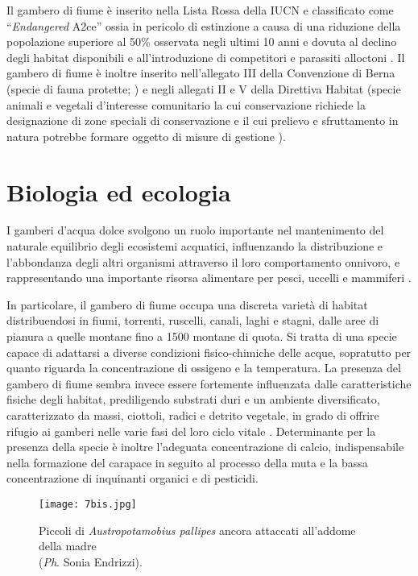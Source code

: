 \documentclass[10pt,twoside,openany,x11names,svgnames,italian,a5paper,dvipsnames,table]{memoir}
\newcommand{\ph}{\emph{Ph}. }
\begin{document}
Il gambero di fiume è inserito nella Lista Rossa della IUCN e classificato come “\emph{Endangered} A2ce” ossia in pericolo di estinzione a causa di una riduzione della popolazione superiore al 50\% osservata negli ultimi 10 anni e dovuta al declino degli habitat disponibili e all’introduzione di competitori e parassiti alloctoni \cite{IUCN}. Il gambero di fiume è inoltre inserito nell’allegato III della Convenzione di Berna (specie di fauna protette; \cite{eucouncil}) e negli allegati II e V della Direttiva Habitat (specie animali e vegetali d’interesse comunitario la cui conservazione richiede la designazione di zone speciali di conservazione e il cui prelievo e sfruttamento in natura potrebbe formare oggetto di misure di gestione \cite{eucommission}).


\section{Biologia ed ecologia}



I gamberi d’acqua dolce svolgono un ruolo importante nel mantenimento del naturale equilibrio degli ecosistemi acquatici, influenzando la distribuzione e l’abbondanza degli altri organismi attraverso il loro comportamento onnivoro, e rappresentando una importante risorsa alimentare per pesci, uccelli e mammiferi \cite{Souty} \cite{Fleury} \cite{Beja}.

In particolare, il gambero di fiume occupa una discreta varietà di habitat distribuendosi in fiumi, torrenti, ruscelli, canali, laghi e stagni, dalle aree di pianura a quelle montane fino a 1500 montane di quota. Si tratta di una specie capace di adattarsi a diverse condizioni fisico-chimiche delle acque, sopratutto per quanto riguarda la concentrazione di ossigeno e la temperatura. La presenza del gambero di fiume sembra invece essere fortemente influenzata dalle caratteristiche fisiche degli habitat, prediligendo substrati duri e un ambiente diversificato, caratterizzato da massi, ciottoli, radici e detrito vegetale, in grado di offrire rifugio ai gamberi nelle varie fasi del loro ciclo vitale \cite{Souty} \cite{Endrizzi13a}. Determinante per la presenza della specie è inoltre l’adeguata concentrazione di calcio, indispensabile nella formazione del carapace in seguito al processo della muta \cite{Jussila} e la bassa concentrazione di inquinanti organici e di pesticidi.

\begin{wrapfigure}[13]{r}{.6\textwidth}
\vspace{-.3cm}
\texttt{[image: 7bis.jpg]}
\caption*{Piccoli di \emph{Austropotamobius pallipes} ancora attaccati all’addome della madre \\ (\ph Sonia Endrizzi).}
\label{fig:austro_piccoli}
\end{wrapfigure}
\end{document}
